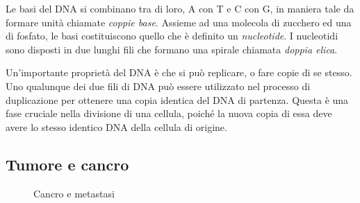 Le basi del DNA si combinano tra di loro, A con T e C con G, in maniera tale da formare unità chiamate \textit{coppie base}. Assieme ad una molecola di zucchero ed una di fosfato, le basi costituiscono quello che è definito un \textit{nucleotide}. I nucleotidi sono disposti in due lunghi fili che formano una spirale chiamata \textit{doppia elica}.

Un'importante proprietà del DNA è che si può replicare, o fare copie di se stesso. Uno qualunque dei due fili di DNA \cite{WhatisDN79:online} può essere utilizzato nel processo di duplicazione per ottenere una copia identica del DNA di partenza. Questa è una fase cruciale nella divisione di una cellula, poiché la nuova copia di essa deve avere lo stesso identico DNA della cellula di origine.

\subsection{Tumore e cancro}

\begin{figure}[h]
    \centering
    \qquad

    \label{fig:cancer-metastasis}
    \caption{Cancro e metastasi}
\end{figure}

